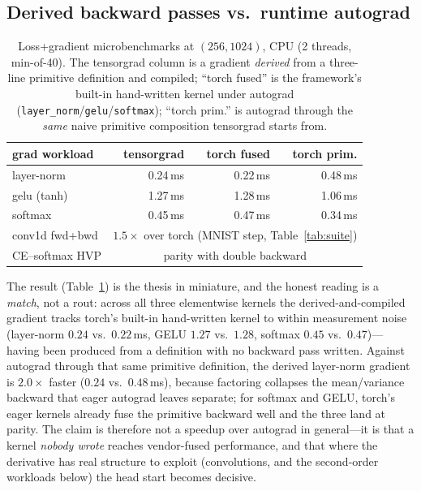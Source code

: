 \documentclass[sigplan,10pt,review]{acmart}
\begin{document}
\subsection{Derived backward passes vs.\ runtime autograd}

\begin{table}
\caption{Loss+gradient microbenchmarks at $(256,1024)$, CPU (2 threads,
min-of-40). The tensorgrad column is a gradient \emph{derived} from a
three-line primitive definition and compiled; ``torch fused'' is the
framework's built-in hand-written kernel under autograd
(\texttt{layer\_norm}/\texttt{gelu}/\texttt{softmax}); ``torch prim.'' is
autograd through the \emph{same} naive primitive composition tensorgrad
starts from.}
\label{tab:micro}
\small
\begin{tabular}{lrrr}
\toprule
grad workload & tensorgrad & torch fused & torch prim. \\
\midrule
layer-norm & 0.24\,ms & 0.22\,ms & 0.48\,ms \\
gelu (tanh) & 1.27\,ms & 1.28\,ms & 1.06\,ms \\
softmax & 0.45\,ms & 0.47\,ms & 0.34\,ms \\
conv1d fwd+bwd & \multicolumn{3}{c}{$1.5\times$ over torch (MNIST step, Table~\ref{tab:suite})} \\
CE--softmax HVP & \multicolumn{3}{c}{parity with double backward} \\
\bottomrule
\end{tabular}
\end{table}

The result (Table~\ref{tab:micro}) is the thesis in miniature, and the
honest reading is a \emph{match}, not a rout: across all three elementwise kernels the
derived-and-compiled gradient tracks torch's built-in hand-written
kernel to within measurement noise (layer-norm $0.24$ vs.\ $0.22$\,ms,
GELU $1.27$ vs.\ $1.28$, softmax $0.45$ vs.\ $0.47$)---having been
produced from a definition with no backward pass written. Against
autograd through that same primitive definition, the derived layer-norm
gradient is $2.0\times$ faster ($0.24$ vs.\ $0.48$\,ms), because
factoring collapses the mean/variance backward that eager autograd
leaves separate; for softmax and GELU, torch's eager kernels already
fuse the primitive backward well and the three land at parity. The claim
is therefore not a speedup over autograd in general---it is that a kernel
\emph{nobody wrote} reaches vendor-fused performance, and that where the
derivative has real structure to exploit (convolutions, and the
second-order workloads below) the head start becomes decisive.
\end{document}
